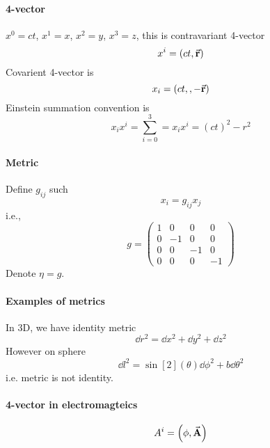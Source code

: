 \paragraph{4-vector}
$x^0=ct$, $x^1=x$, $x^2=y$, $x^3=z$, this is contravariant 4-vector
$$x^i = \qty(ct, \va{r})$$
Covarient 4-vector is
$$x_i = \qty(ct,, -\va{r})$$
Einstein summation convention is
$$x_ix^i = \sum_{i=0}^3 = x_ix^i = (ct)^2 - r^2$$
\paragraph{Metric}
Define $g_{ij}$ such 
$$x_i = g_{ij} x_j$$
i.e.,
$$g = \begin{pmatrix}
1&0&0&0\\
0&-1&0&0\\
0&0&-1&0\\
0&0&0&-1
\end{pmatrix}$$
Denote $\eta=g$.
\paragraph{Examples of metrics}
In 3D, we have identity metric
$$\dd{r^2} = \dd{x^2} + \dd{y^2} + \dd{z^2}$$
However on sphere 
$$\dd{l^2} = \sin[2](\theta) \dd{\phi^2} +b\dd{\theta^2}$$
i.e. metric is not identity.
\paragraph{4-vector in electromagteics}
$$A^i = \qty(\phi, \va{A})$$
